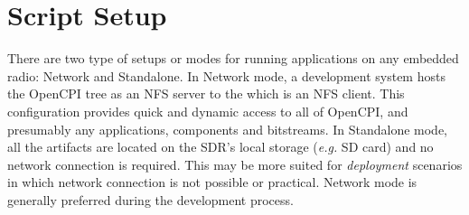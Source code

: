\iffalse
This file is protected by Copyright. Please refer to the COPYRIGHT file
distributed with this source distribution.

This file is part of OpenCPI <http://www.opencpi.org>

OpenCPI is free software: you can redistribute it and/or modify it under the
terms of the GNU Lesser General Public License as published by the Free Software
Foundation, either version 3 of the License, or (at your option) any later
version.

OpenCPI is distributed in the hope that it will be useful, but WITHOUT ANY
WARRANTY; without even the implied warranty of MERCHANTABILITY or FITNESS FOR A
PARTICULAR PURPOSE. See the GNU Lesser General Public License for more details.

You should have received a copy of the GNU Lesser General Public License along
with this program. If not, see <http://www.gnu.org/licenses/>.
\fi


\section{Script Setup}
There are two type of setups or modes for running applications on any embedded radio: Network and Standalone. In Network mode, a development system hosts the OpenCPI tree as an NFS server to the \radioName \space which is an NFS client. This configuration provides quick and dynamic access to all of OpenCPI, and presumably any applications, components and bitstreams. In Standalone mode, all the artifacts are located on the SDR's local storage (\textit{e.g.} SD card) and no network connection is required. This may be more suited for \textit{deployment} scenarios in which network connection is not possible or practical. Network mode is generally preferred during the development process.

